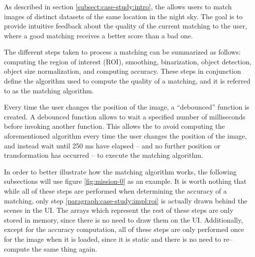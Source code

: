 \subsubsection{\mlblinkui} \label{subsubsect:case-study:impl:ml-blink-ui}

As described in section \ref{subsect:case-study:intro}, the \mlblinkui allows users to match images of distinct datasets of the same location in the night sky. The goal is to provide intuitive feedback about the quality of the current matching to the user, where a good matching receives a better score than a bad one. 

The different steps taken to process a matching can be summarized as follows: computing the region of interest (ROI), smoothing, binarization, object detection, object size normalization, and computing accuracy. These steps in conjunction define the algorithm used to compute the quality of a matching, and it is referred to as the matching algorithm.

Every time the user changes the position of the \panstarrs image, a ``debounced'' function is created. A debounced function allows to wait a specified number of milliseconds before invoking another function. This allows the \mlblinkui to avoid computing the aforementioned algorithm every time the user changes the position of the \panstarrs image, and instead wait until 250 \si{\milli\second} have elapsed -- and no further position or transformation has occurred -- to execute the matching algorithm.

In order to better illustrate how the matching algorithm works, the following subsections will use figure \ref{fig:mission-0} as an example. It is worth nothing that while all of these steps are performed when determining the accuracy of a matching, only step \ref{paragraph:case-study:impl:roi} is actually drawn behind the scenes in the UI. The arrays which represent the rest of these steps are only stored in memory, since there is no need to draw them on the UI. Additionally, except for the accuracy computation, all of these steps are only performed once for the \usno image when it is loaded, since it is static and there is no need to re--compute the same thing again.

